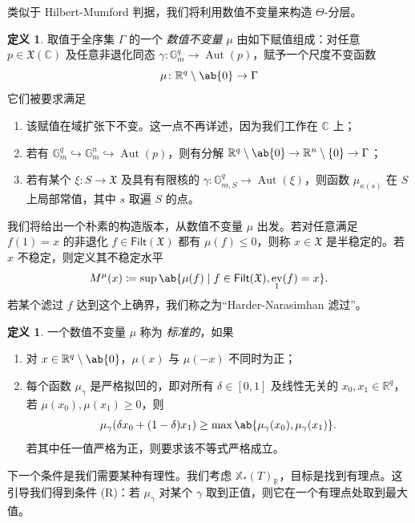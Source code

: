 \documentclass{amsart}
\theoremstyle{definition}
\newtheorem{defn}[thm]{定义}
\theoremstyle{remark}
\theoremstyle{plain}
\theoremstyle{definition}
\theoremstyle{remark}
\newcommand{\G}{\mathbb{G}}
\newcommand{\R}{\mathbb{R}}
\newcommand{\C}{\mathbb{C}}
\newcommand{\mf}[1]{\mathfrak{#1}}
\newcommand{\ms}[1]{\mathsf{#1}}
\newcommand{\1}{\mathbf{1}}
\newcommand{\2}{\mathbf{2}}
\newcommand{\3}{\mathbf{3}}
\DeclareMathOperator{\Aut}{Aut}
\DeclareMathOperator{\ev}{ev}
\begin{document}
类似于 Hilbert-Mumford 判据，我们将利用数值不变量来构造 \(\Theta\)-分层。
\begin{defn}
    取值于全序集 \(\Gamma\) 的一个 \textit{数值不变量} \(\mu\) 由如下赋值组成：对任意 \(p \in \mf{X}(\C)\) 及任意非退化同态 \(\gamma \colon \G_m^q \to \Aut(p)\)，赋予一个尺度不变函数
    \[ \mu \colon \R^q \setminus \ab\{0\} \to \Gamma \]
    它们被要求满足
    \begin{enumerate}
        \item 该赋值在域扩张下不变。这一点不再详述，因为我们工作在 \(\C\) 上；
        \item 若有 \(\G_m^q \hookrightarrow \G_m^n \hookrightarrow \Aut(p)\)，则有分解 \(\R^q \setminus \ab\{0\} \to \R^n \setminus \{0\} \to \Gamma\)；
        \item 若有某个 \(\xi \colon S \to \mf{X}\) 及具有有限核的 \(\gamma \colon \G_{m, S}^q \to \Aut(\xi)\)，则函数 \(\mu_{\kappa(s)}\) 在 \(S\) 上局部常值，其中 \(s\) 取遍 \(S\) 的点。
    \end{enumerate}
\end{defn}

我们将给出一个朴素的构造版本，从数值不变量 \(\mu\) 出发。若对任意满足 \(f(1) = x\) 的非退化 \(f \in \ms{Filt}(\mf{X})\) 都有 \(\mu(f) \leq 0\)，则称 \(x \in \mf{X}\) 是半稳定的。若 \(x\) 不稳定，则定义其不稳定水平
\[ M^{\mu}(x) \coloneqq \sup \ab\{ \mu(f) \mid f \in \ms{Filt}(\mf{X}), \ev_1(f) = x\}. \]
若某个滤过 \(f\) 达到这个上确界，我们称之为“Harder-Narasimhan 滤过”。

\begin{defn}
    一个数值不变量 \(\mu\) 称为 \textit{标准的}，如果
    \begin{enumerate}
        \item 对 \(x \in \R^q \setminus \ab\{0\}\)，\(\mu(x)\) 与 \(\mu(-x)\) 不同时为正；
        \item 每个函数 \(\mu_{\gamma}\) 是严格拟凹的，即对所有 \(\delta \in [0,1]\) 及线性无关的 \(x_0, x_1 \in \R^q\)，若 \(\mu(x_0), \mu(x_1) \geq 0\)，则 
            \[\mu_{\gamma}(\delta x_0 + (1-\delta)x_1) \geq \max\ab\{\mu_{\gamma}(x_0), \mu_{\gamma}(x_1)\}.\] 若其中任一值严格为正，则要求该不等式严格成立。
    \end{enumerate}
\end{defn}

下一个条件是我们需要某种有理性。我们考虑 \(\mathbb{X}_*(T)_{\R}\)，目标是找到有理点。这引导我们得到条件 (R)：若 \(\mu_{\gamma}\) 对某个 \(\gamma\) 取到正值，则它在一个有理点处取到最大值。
\end{document}
